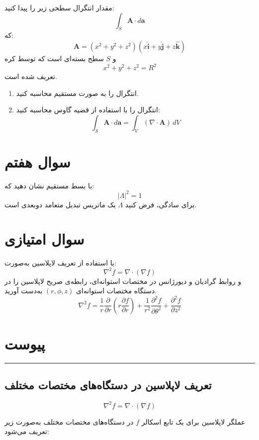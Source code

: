 \documentclass[a4paper,16pt]{article}
\begin{document}
	مقدار انتگرال سطحی زیر را پیدا کنید:
	\[
	\int_S \mathbf{A} \cdot d\mathbf{a}
	\]
	که:
	\[
	\mathbf{A} = (x^2 + y^2 + z^2)(x \hat{\mathbf{i}} + y \hat{\mathbf{j}} + z \hat{\mathbf{k}})
	\]
	و $S$ سطح بسته‌ای است که توسط کره
	\[
	x^2 + y^2 + z^2 = R^2
	\]
	تعریف شده است.
	
	\begin{enumerate}
		\item انتگرال را به صورت مستقیم محاسبه کنید.
		\item انتگرال را با استفاده از قضیه گاوس  محاسبه کنید:
		\[
		\int_S \mathbf{A} \cdot d\mathbf{a} = \int_V (\nabla \cdot \mathbf{A}) \, dV
		\]
	\end{enumerate}
	\newpage
	\section{سوال هفتم}
	
	با بسط مستقیم نشان دهید که:
	\[
	|\Lambda|^2 = 1
	\]
	برای سادگی، فرض کنید \(\Lambda\) یک ماتریس تبدیل متعامد دوبعدی است.
	
	\section{سوال امتیازی}
	با استفاده از تعریف لاپلاسین به‌صورت:
	\[
	\nabla^2 f = \nabla \cdot (\nabla f)
	\]
	و روابط گرادیان و دیورژانس در مختصات استوانه‌ای، 
	رابطه‌ی صریح لاپلاسین را در دستگاه مختصات استوانه‌ای \((r, \phi, z)\) به‌دست آورید.
	\[
	\nabla^2 f =
	\frac{1}{r} \frac{\partial}{\partial r}
	\left( r \frac{\partial f}{\partial r} \right)
	+ \frac{1}{r^2} \frac{\partial^2 f}{\partial \theta^2}
	+ \frac{\partial^2 f}{\partial z^2}
	\]
	
	
	
	\newpage
	\section{پیوست}
	
	\hrule\vspace{1em}
	\subsection*{تعریف لاپلاسین در دستگاه‌های مختصات مختلف}
	
	
	\[
	\nabla^2 f = \nabla \cdot (\nabla f)
	\]
	
	عملگر لاپلاسین برای یک تابع اسکالر $f$ در دستگاه‌های مختصات مختلف به‌صورت زیر تعریف می‌شود:
	
	
	
\end{document}
